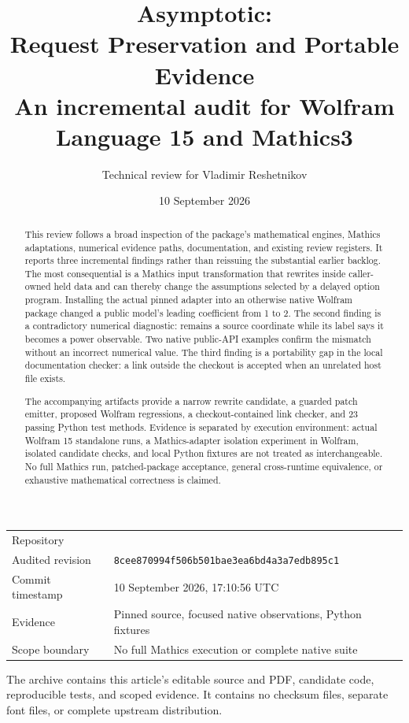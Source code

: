 \documentclass[11pt,letterpaper]{article}
\title{\vspace{-0.5in}\textbf{Asymptotic:\\Request Preservation and Portable Evidence}\\[10pt]
\large An incremental audit for Wolfram Language 15 and Mathics3}
\author{Technical review for Vladimir Reshetnikov}
\date{10 September 2026}
\newcommand{\code}[1]{\texttt{\detokenize{#1}}}
\newcommand{\pin}{\texttt{8cee870994f506b501bae3ea6bd4a3a7edb895c1}}
\begin{document}
\maketitle
\thispagestyle{empty}
\begin{center}
\begin{tabular}{ll}
\toprule
Repository & \code{VladimirReshetnikov/Asymptotic}\\
Audited revision & \pin\\
Commit timestamp & 10 September 2026, 17:10:56 UTC\\
Evidence & Pinned source, focused native observations, Python fixtures\\
Scope boundary & No full Mathics execution or complete native suite\\
\bottomrule
\end{tabular}
\end{center}
\vspace{8pt}
\begin{abstract}
This review follows a broad inspection of the package's mathematical engines,
Mathics adaptations, numerical evidence paths, documentation, and existing
review registers. It reports three incremental findings rather than reissuing
the substantial earlier backlog. The most consequential is a Mathics input
transformation that rewrites \code{Element} inside caller-owned held data and
can thereby change the assumptions selected by a delayed option program.
Installing the actual pinned adapter into an otherwise native Wolfram package
changed a public model's leading coefficient from 1 to 2. The second finding is
a contradictory numerical diagnostic: \code{LocalRoot} remains a source
coordinate while its label says it becomes a power observable. Two native
public-API examples confirm the mismatch without an incorrect numerical value.
The third finding is a portability gap in the local documentation checker:
a link outside the checkout is accepted when an unrelated host file exists.

The accompanying artifacts provide a narrow rewrite candidate, a guarded patch
emitter, proposed Wolfram regressions, a checkout-contained link checker, and
23 passing Python test methods. Evidence is separated by execution environment:
actual Wolfram 15 standalone runs, a Mathics-adapter isolation experiment in
Wolfram, isolated candidate checks, and local Python fixtures are not treated as
interchangeable. No full Mathics run, patched-package acceptance, general
cross-runtime equivalence, or exhaustive mathematical correctness is claimed.
\end{abstract}
\vfill
\small The archive contains this article's editable source and PDF, candidate
code, reproducible tests, and scoped evidence. It contains no checksum files,
separate font files, or complete upstream distribution.
\clearpage
\begingroup
\small
\setlength{\parskip}{0pt}
\tableofcontents
\endgroup
\clearpage
\end{document}
